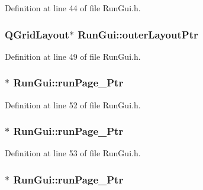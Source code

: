 Definition at line 44 of file Run\-Gui.\-h.

\hypertarget{class_run_gui_ae4cdc2ec0797c9121a47b9cdf3b93115}{
\subsubsection[{outer\-Layout\-Ptr}]{\setlength{\rightskip}{0pt plus 5cm}Q\-Grid\-Layout$\ast$ Run\-Gui\-::outer\-Layout\-Ptr\hspace{0.3cm}{\ttfamily [private]}}}\label{class_run_gui_ae4cdc2ec0797c9121a47b9cdf3b93115}


Definition at line 49 of file Run\-Gui.\-h.

\hypertarget{class_run_gui_aa52f64156c00bbd4e14c46b8113e3072}{
\subsubsection[{run\-Page\-\_\-1\-Ptr}]{$\ast$ Run\-Gui\-::run\-Page\-\_\-Ptr\hspace{0.3cm}{\ttfamily [private]}}}\label{class_run_gui_aa52f64156c00bbd4e14c46b8113e3072}


Definition at line 52 of file Run\-Gui.\-h.

\hypertarget{class_run_gui_a86764c1a0c9629fbce62c7cb13c5ee07}{
\subsubsection[{run\-Page\-\_\-2\-Ptr}]{$\ast$ Run\-Gui\-::run\-Page\-\_\-Ptr\hspace{0.3cm}{\ttfamily [private]}}}\label{class_run_gui_a86764c1a0c9629fbce62c7cb13c5ee07}


Definition at line 53 of file Run\-Gui.\-h.

\hypertarget{class_run_gui_a7306b4df6c8619a98da052935a021cf8}{
\subsubsection[{run\-Page\-\_\-3\-Ptr}]{$\ast$ Run\-Gui\-::run\-Page\-\_\-Ptr\hspace{0.3cm}{\ttfamily [private]}}}\label{class_run_gui_a7306b4df6c8619a98da052935a021cf8}


